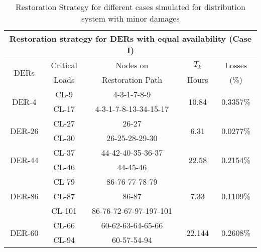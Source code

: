 \documentclass[12pt]{article}
\begin{document}
	
	\begin{table}[t]
		\centering
		\caption{Restoration Strategy for different cases simulated for distribution system with minor damages}
		\label{singletable}
\tiny
		\begin{tabular}{c|c|c|c|c}
			\toprule[0.4 mm]
			
			\multicolumn{5}{c}{    Restoration strategy for DERs with equal availability (Case I)}\\
			
			\toprule[0.4 mm]
			\hline
			\multirow{2}{*}{DERs} & Critical & Nodes on &$T_k$& Losses\\
			&Loads&Restoration Path &Hours&(\%)\\
			\hline
			\hline
			\multirow{2}{*}{DER-4}& CL-9& 4-3-1-7-8-9&\multirow{2}{*}{10.84}&\multirow{2}{*}{0.3357\%}\\
			&CL-17&4-3-1-7-8-13-34-15-17& & \\
			\hline
			\multirow{2}{*}{DER-26}& CL-27& 26-27&\multirow{2}{*}{6.31}&\multirow{2}{*}{0.0277\%}\\
			&CL-30&26-25-28-29-30& & \\
			\hline
			\multirow{2}{*}{DER-44}& CL-37& 44-42-40-35-36-37&\multirow{2}{*}{22.58}&\multirow{2}{*}{0.2154\%}\\
			&CL-46&44-45-46& & \\
			\hline
			\multirow{3}{*}{DER-86}& CL-79& 86-76-77-78-79&\multirow{3}{*}{7.33}&\multirow{3}{*}{0.1109\%}\\
			&CL-87&86-87& & \\
			&CL-101&86-76-72-67-97-197-101& & \\
			\hline
			\multirow{2}{*}{DER-60}& CL-66& 60-62-63-64-65-66&\multirow{2}{*}{22.144}&\multirow{2}{*}{0.2608\%}\\
			&CL-94&60-57-54-94& &\\
			\toprule[0.4 mm]
			

\end{tabular}
\end{table}
\end{document}
